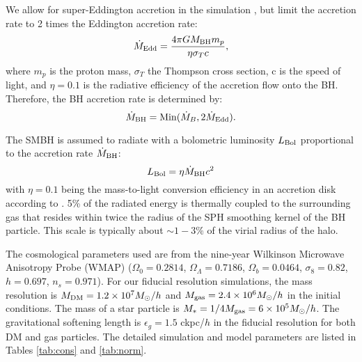 We allow for super-Eddington accretion in the simulation \citep[e.g.][]{Volonteri2005,Volonteri2015}, but limit the accretion rate to 2 times the Eddington accretion rate:
\begin{equation}
\label{equation:Meddington}
    \dot{M}_{\rm Edd} = \frac{4 \pi G M_{\rm BH} m_p}{\eta \sigma_{T} c},
\end{equation}
where $m_p$ is the proton mass, $\sigma_T$ the Thompson cross section, c is the speed of light, and $\eta=0.1$ is the radiative efficiency of the accretion flow onto the BH.
Therefore, the BH accretion rate is determined by:
\begin{equation}
    \dot{M}_{\rm BH} = {\rm Min} (\dot{M}_{B}, 2\dot{M}_{\rm Edd}).
\end{equation}


The SMBH is assumed to radiate with a bolometric luminosity $L_{\rm Bol}$ proportional to the accretion rate $\dot{M}_{\rm BH}$:
\begin{equation}
    L_{\rm Bol} = \eta \dot{M}_{\rm BH} c^2
\end{equation}
with $\eta = 0.1$ being the mass-to-light conversion efficiency in an accretion disk according to \cite{Shakura1973}.
5\% of the radiated energy is thermally coupled to the surrounding gas that resides within twice the radius of the SPH smoothing kernel of the BH particle. This scale is typically about $\sim 1-3\%$ of the virial radius of the halo.

The cosmological parameters used are from the nine-year Wilkinson Microwave Anisotropy Probe (WMAP) \citep{Hinshaw2013} ($\Omega_0=0.2814$, $\Omega_\Lambda=0.7186$, $\Omega_b=0.0464$, $\sigma_8=0.82$, $h=0.697$, $n_s=0.971$).
For our fiducial resolution simulations, the mass resolution is $M_{\rm DM} = 1.2 \times 10^7 M_\odot/h$ and $M_{\rm gas} = 2.4 \times 10^6 M_\odot/h$ in the initial conditions.
The mass of a star particle is $M_{*} = 1/4 M_{\rm gas} = 6 \times 10^5 M_\odot/h$. The gravitational softening length is $\epsilon_g = 1.5$ ckpc/$h$ in the fiducial resolution for both DM and gas particles. The detailed simulation and model parameters are listed in Tables \ref{tab:cons} and \ref{tab:norm}. 